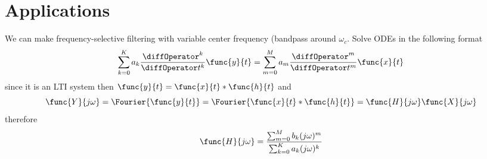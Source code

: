 \section{Applications}
We can make frequency-selective filtering with variable center frequency (bandpass around \(\omega_c\). Solve ODEs in the following format 
\begin{equation*}
    \sum_{k = 0}^K a_k \dfrac{\diffOperator^k }{\diffOperator t^k} \func{y}{t} = \sum_{m = 0}^M a_m \dfrac{\diffOperator^m }{\diffOperator t^m} \func{x}{t} 
\end{equation*}
since it is an LTI system then \(\func{y}{t} = \func{x}{t } \ast \func{h}{t}\) and
\begin{equation*}
    \func{Y}{j\omega} = \Fourier{\func{y}{t}} = \Fourier{\func{x}{t} \ast \func{h}{t}}= \func{H}{j\omega} \func{X}{j\omega}
\end{equation*}
therefore 
\begin{equation*}
    \func{H}{j\omega} = \dfrac{\sum_{m = 0}^M b_k (j\omega)^m}{\sum_{k=0}^K a_k (j\omega)^k}
\end{equation*}
